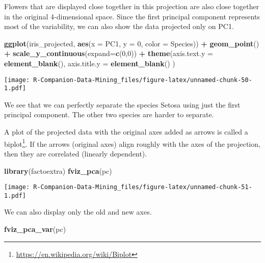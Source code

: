 \documentclass[
  notitlepage]{book}
\newenvironment{Shaded}{\begin{snugshade}}{\end{snugshade}}
\newcommand{\DataTypeTok}[1]{\textcolor[rgb]{0.13,0.29,0.53}{#1}}
\newcommand{\DecValTok}[1]{\textcolor[rgb]{0.00,0.00,0.81}{#1}}
\newcommand{\KeywordTok}[1]{\textcolor[rgb]{0.13,0.29,0.53}{\textbf{#1}}}
\newcommand{\NormalTok}[1]{#1}
\newcommand{\OperatorTok}[1]{\textcolor[rgb]{0.81,0.36,0.00}{\textbf{#1}}}
\newcommand{\StringTok}[1]{\textcolor[rgb]{0.31,0.60,0.02}{#1}}
\DeclareRobustCommand{\href}[2]{#2\footnote{\url{#1}}}
\begin{document}
Flowers that are displayed close together in this projection are also
close together in the original 4-dimensional space. Since the first
principal component represents most of the variability, we can also show
the data projected only on PC1.

\begin{Shaded}
\begin{Highlighting}[]
\KeywordTok{ggplot}\NormalTok{(iris\_projected, }
  \KeywordTok{aes}\NormalTok{(}\DataTypeTok{x =}\NormalTok{ PC1, }\DataTypeTok{y =} \DecValTok{0}\NormalTok{, }\DataTypeTok{color =}\NormalTok{ Species)) }\OperatorTok{+}\StringTok{ }
\StringTok{  }\KeywordTok{geom\_point}\NormalTok{() }\OperatorTok{+}
\StringTok{  }\KeywordTok{scale\_y\_continuous}\NormalTok{(}\DataTypeTok{expand=}\KeywordTok{c}\NormalTok{(}\DecValTok{0}\NormalTok{,}\DecValTok{0}\NormalTok{)) }\OperatorTok{+}
\StringTok{  }\KeywordTok{theme}\NormalTok{(}\DataTypeTok{axis.text.y =} \KeywordTok{element\_blank}\NormalTok{(),}
      \DataTypeTok{axis.title.y =} \KeywordTok{element\_blank}\NormalTok{()}
\NormalTok{  )}
\end{Highlighting}
\end{Shaded}

\texttt{[image: R-Companion-Data-Mining\_files/figure-latex/unnamed-chunk-50-1.pdf]}

We see that we can perfectly separate the species Setosa using just the
first principal component. The other two species are harder to separate.

A plot of the projected data with the original axes added as arrows is
called a \href{https://en.wikipedia.org/wiki/Biplot}{biplot}. If the arrows
(original axes) align roughly with the axes of the projection, then they
are correlated (linearly dependent).

\begin{Shaded}
\begin{Highlighting}[]
\KeywordTok{library}\NormalTok{(factoextra)}
\KeywordTok{fviz\_pca}\NormalTok{(pc)}
\end{Highlighting}
\end{Shaded}

\texttt{[image: R-Companion-Data-Mining\_files/figure-latex/unnamed-chunk-51-1.pdf]}

We can also display only the old and new axes.

\begin{Shaded}
\begin{Highlighting}[]
\KeywordTok{fviz\_pca\_var}\NormalTok{(pc)}
\end{Highlighting}
\end{Shaded}
\end{document}
